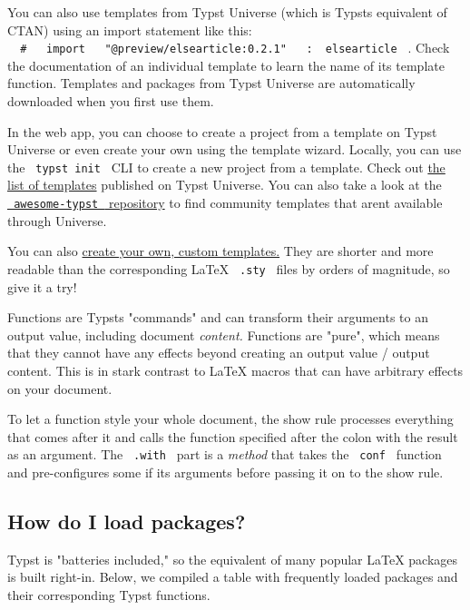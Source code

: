You can also use templates from Typst Universe (which is
Typst\textquotesingle s equivalent of CTAN) using an import statement
like this:
\texttt{\ }{\texttt{\ \#\ }}\texttt{\ }{\texttt{\ import\ }}\texttt{\ }{\texttt{\ "@preview/elsearticle:0.2.1"\ }}\texttt{\ }{\texttt{\ :\ }}\texttt{\ elsearticle\ }
. Check the documentation of an individual template to learn the name of
its template function. Templates and packages from Typst Universe are
automatically downloaded when you first use them.

In the web app, you can choose to create a project from a template on
Typst Universe or even create your own using the template wizard.
Locally, you can use the \texttt{\ typst\ init\ } CLI to create a new
project from a template. Check out
\href{https://typst.app/universe/search/?kind=templates}{the list of
templates} published on Typst Universe. You can also take a look at the
\href{https://github.com/qjcg/awesome-typst}{\texttt{\ awesome-typst\ }
repository} to find community templates that aren\textquotesingle t
available through Universe.

You can also \href{/docs/tutorial/making-a-template/}{create your own,
custom templates.} They are shorter and more readable than the
corresponding LaTeX \texttt{\ .sty\ } files by orders of magnitude, so
give it a try!

Functions are Typst\textquotesingle s "commands" and can transform their
arguments to an output value, including document \emph{content.}
Functions are "pure", which means that they cannot have any effects
beyond creating an output value / output content. This is in stark
contrast to LaTeX macros that can have arbitrary effects on your
document.

To let a function style your whole document, the show rule processes
everything that comes after it and calls the function specified after
the colon with the result as an argument. The \texttt{\ .with\ } part is
a \emph{method} that takes the \texttt{\ conf\ } function and
pre-configures some if its arguments before passing it on to the show
rule.

\subsection{How do I load packages?}\label{packages}

Typst is "batteries included," so the equivalent of many popular LaTeX
packages is built right-in. Below, we compiled a table with frequently
loaded packages and their corresponding Typst functions.

